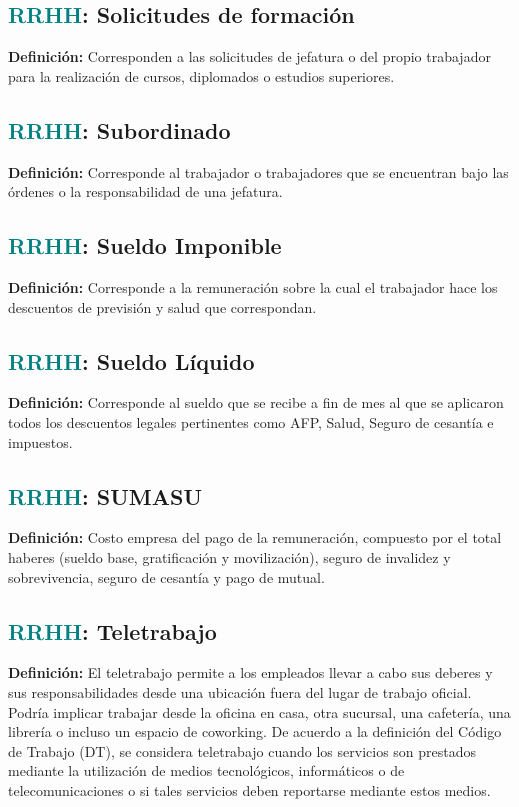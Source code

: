 \documentclass[12pt]{article}
\begin{document}
\subsection{\textcolor{teal}{RRHH}: Solicitudes de formación}
\textbf{Definición:} Corresponden a las solicitudes de jefatura o del propio trabajador para la realización de cursos, diplomados o estudios superiores.
\subsection{\textcolor{teal}{RRHH}: Subordinado}
\textbf{Definición:} Corresponde al trabajador o trabajadores que se encuentran bajo las órdenes o la responsabilidad de una jefatura.
\subsection{\textcolor{teal}{RRHH}: Sueldo Imponible}
\textbf{Definición:} Corresponde a la remuneración sobre la cual el trabajador hace los descuentos de previsión y salud que correspondan.
\subsection{\textcolor{teal}{RRHH}: Sueldo Líquido}
\textbf{Definición:} Corresponde al sueldo que se recibe a fin de mes al que se aplicaron todos los descuentos legales pertinentes como AFP, Salud, Seguro de cesantía e impuestos.
\subsection{\textcolor{teal}{RRHH}: SUMASU}
\textbf{Definición:} Costo empresa del pago de la remuneración, compuesto por el total haberes (sueldo base, gratificación y movilización), seguro de invalidez y sobrevivencia, seguro de cesantía y pago de mutual.
\subsection{\textcolor{teal}{RRHH}: Teletrabajo}
\textbf{Definición:} El teletrabajo permite a los empleados llevar a cabo sus deberes y sus responsabilidades desde una ubicación fuera del lugar de trabajo oficial. Podría implicar trabajar desde la oficina en casa, otra sucursal, una cafetería, una librería o incluso un espacio de coworking.
De acuerdo a la definición del Código de Trabajo (DT), se considera teletrabajo cuando los servicios son prestados mediante la utilización de medios tecnológicos, informáticos o de telecomunicaciones o si tales servicios deben reportarse mediante estos medios.
\end{document}
